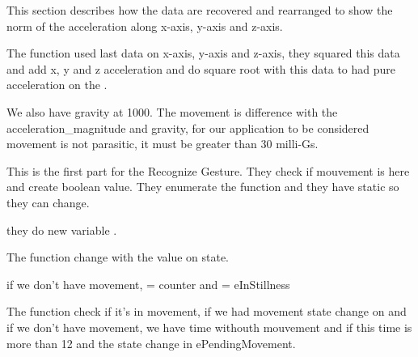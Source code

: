 \begin{center}
    \label{Magic Wand function}
\end{center}

This section describes how the data are recovered and rearranged to show the norm of the acceleration along x-axis, y-axis and z-axis.

The function used last data on x-axis, y-axis and z-axis, they squared this data and add x, y and z acceleration and do square root with this data to had pure acceleration on the .

We also have gravity at 1000. The movement is difference with the acceleration\_magnitude and gravity, for our application to be considered movement is not parasitic, it must be greater than 30 milli-Gs.  

\begin{center}
    \label{Magic Wand function}
\end{center}

This is the first part for the Recognize Gesture. They check if mouvement is here and create boolean value. They enumerate the function and they have static so they can change. 

they do new variable . 

The function  change with the value on state. 


if we don't have movement,  = counter and  = eInStillness 


\begin{center}
    \label{Magic Wand function}
\end{center}


The function  check if it's in movement, if we had movement state change on  and if we don't have movement, we have time withouth mouvement and if this time is more than 12  and the state change in ePendingMovement. 

\begin{center}
    \label{Magic Wand function}
\end{center}


